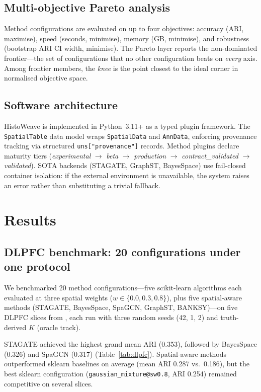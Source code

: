 \documentclass[]{bioinfo}
\begin{document}
\subsection{Multi-objective Pareto analysis}

Method configurations are evaluated on up to four objectives: accuracy
(ARI, maximise), speed (seconds, minimise), memory (GB, minimise), and
robustness (bootstrap ARI CI width, minimise). The Pareto layer reports
the non-dominated frontier---the set of configurations that no other
configuration beats on \emph{every} axis. Among frontier members,
the \emph{knee} is the point closest to the ideal corner in normalised
objective space.

\subsection{Software architecture}

HistoWeave is implemented in Python~3.11+ as a typed plugin framework.
The \texttt{SpatialTable} data model wraps \texttt{SpatialData} and
\texttt{AnnData}, enforcing provenance tracking via structured
\texttt{uns["provenance"]} records. Method plugins declare maturity
tiers (\textit{experimental} $\to$ \textit{beta} $\to$
\textit{production} $\to$ \textit{contract\_validated} $\to$
\textit{validated}). SOTA backends (STAGATE, GraphST, BayesSpace) use
fail-closed container isolation: if the external environment is
unavailable, the system raises an error rather than substituting a
trivial fallback.

\section{Results}

\subsection{DLPFC benchmark: 20 configurations under one protocol}
\label{sec:dlpfc}

We benchmarked 20 method configurations---five scikit-learn algorithms
each evaluated at three spatial weights
(\(w \in \{0.0, 0.3, 0.8\}\)), plus five spatial-aware methods
(STAGATE, BayesSpace, SpaGCN, GraphST, BANKSY)---on five DLPFC slices
from \citet{maynard2021}, each run with three random seeds (42, 1, 2)
and truth-derived \(K\) (oracle track).

STAGATE achieved the highest grand mean ARI
(0.353), followed by BayesSpace (0.326) and SpaGCN (0.317)
(Table~\ref{tab:dlpfc}). Spatial-aware methods outperformed sklearn
baselines on average (mean ARI 0.287 vs.\ 0.186), but the best sklearn
configuration (\texttt{gaussian\_mixture@sw0.8}, ARI 0.254) remained
competitive on several slices.
\end{document}
